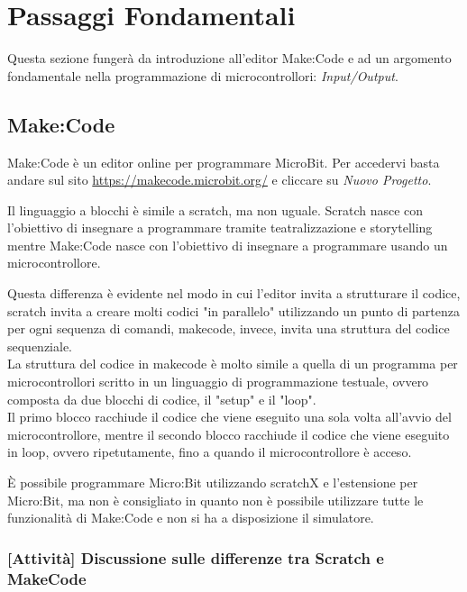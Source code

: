 \documentclass[../../docenti.tex]{subfiles}
\begin{document}
\section{Passaggi Fondamentali}
Questa sezione fungerà da introduzione all'editor Make:Code e ad un argomento fondamentale nella programmazione di microcontrollori: \textit{Input/Output}.

\subsection{Make:Code}
Make:Code è un editor online per programmare MicroBit. Per accedervi basta andare sul sito \url{https://makecode.microbit.org/} e cliccare su \textit{Nuovo Progetto}.

Il linguaggio a blocchi è simile a scratch, ma non uguale. Scratch nasce con l'obiettivo di insegnare a programmare tramite teatralizzazione e storytelling mentre Make:Code nasce con l'obiettivo di insegnare a programmare usando un microcontrollore.

Questa differenza è evidente nel modo in cui l'editor invita a strutturare il codice, scratch invita a creare molti codici "in parallelo" utilizzando un punto di partenza per ogni sequenza di comandi, makecode, invece, invita una struttura del codice sequenziale.\\
La struttura del codice in makecode è molto simile a quella di un programma per microcontrollori scritto in un linguaggio di programmazione testuale, ovvero composta da due blocchi di codice, il "setup" e il "loop".\\
Il primo blocco racchiude il codice che viene eseguito una sola volta all'avvio del microcontrollore, mentre il secondo blocco racchiude il codice che viene eseguito in loop, ovvero ripetutamente, fino a quando il microcontrollore è acceso.

È possibile programmare Micro:Bit utilizzando scratchX e l'estensione per Micro:Bit, ma non è consigliato in quanto non è possibile utilizzare tutte le funzionalità di Make:Code e non si ha a disposizione il simulatore.



\subsubsection{[Attività] Discussione sulle differenze tra Scratch e MakeCode}

\end{document}
